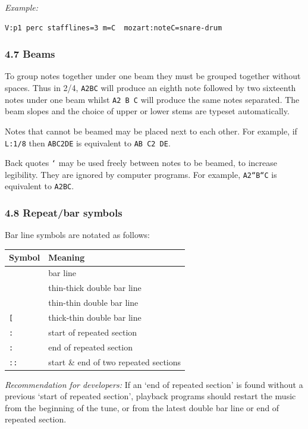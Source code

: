 \documentclass[oneside]{book}
\begin{document}
\emph{Example:}

\begin{verbatim}
V:p1 perc stafflines=3 m=C  mozart:noteC=snare-drum
\end{verbatim}

\hypertarget{beams}{\subsubsection{4.7 Beams}\label{beams}}

To group notes together under one beam they must be grouped together
without spaces. Thus in 2/4, \texttt{A2BC} will produce an eighth note
followed by two sixteenth notes under one beam whilst \texttt{A2\ B\ C}
will produce the same notes separated. The beam slopes and the choice of
upper or lower stems are typeset automatically.

Notes that cannot be beamed may be placed next to each other. For
example, if \texttt{L:1/8} then \texttt{ABC2DE} is equivalent to
\texttt{AB\ C2\ DE}.

Back quotes \texttt{`} may be used freely between notes to be beamed, to
increase legibility. They are ignored by computer programs. For example,
\texttt{A2``B``C} is equivalent to \texttt{A2BC}.

\hypertarget{repeat_bar_symbols}{\subsubsection{4.8 Repeat/bar
symbols}\label{repeat_bar_symbols}}

Bar line symbols are notated as follows:

\begin{longtable}[]{@{}ll@{}}
\toprule
\textbf{Symbol} & \textbf{Meaning}\tabularnewline
\midrule
\endhead
\texttt{\textbar{}} & bar line\tabularnewline
\texttt{\textbar{}{]}} & thin-thick double bar line\tabularnewline
\texttt{\textbar{}\textbar{}} & thin-thin double bar line\tabularnewline
\texttt{{[}\textbar{}} & thick-thin double bar line\tabularnewline
\texttt{\textbar{}:} & start of repeated section\tabularnewline
\texttt{:\textbar{}} & end of repeated section\tabularnewline
\texttt{::} & start \& end of two repeated sections\tabularnewline
\bottomrule
\end{longtable}

\emph{Recommendation for developers:} If an `end of repeated section' is
found without a previous `start of repeated section', playback programs
should restart the music from the beginning of the tune, or from the
latest double bar line or end of repeated section.
\end{document}
